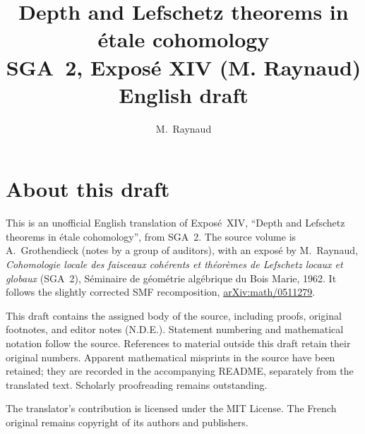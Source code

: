 \documentclass[11pt,a4paper,oneside]{amsbook}
\title[SGA~2, Exposé XIV (M. Raynaud) (English draft)]{Depth and Lefschetz theorems in \'etale cohomology\\
{\normalsize SGA~2, Exposé XIV (M. Raynaud)\\English draft}}
\author{M.\ Raynaud}
\date{}
\begin{document}
\frontmatter
\maketitle

\chapter*{About this draft}
This is an unofficial English translation of Expos\'e~XIV, ``Depth and Lefschetz theorems in étale cohomology'',
from SGA~2. The source volume is A.\ Grothendieck
(notes by a group of auditors), with an expos\'e by M.\ Raynaud,
\textit{Cohomologie locale des faisceaux coh\'erents et th\'eor\`emes
de Lefschetz locaux et globaux} (SGA~2), S\'eminaire de g\'eom\'etrie
alg\'ebrique du Bois Marie, 1962. It follows the slightly corrected
SMF recomposition,
\href{https://arxiv.org/abs/math/0511279}{arXiv:math/0511279}.

This draft contains the assigned body of the source, including proofs,
original footnotes, and editor notes (N.D.E.). Statement numbering and
mathematical notation follow the source. References to material outside
this draft retain their original numbers. Apparent mathematical
misprints in the source have been retained; they are recorded in the
accompanying README, separately from the translated text. Scholarly
proofreading remains outstanding.

The translator's contribution is licensed under
the MIT License.
The French original remains copyright of its authors and publishers.

\tableofcontents
\mainmatter
\setcounter{chapter}{13}









\end{document}
